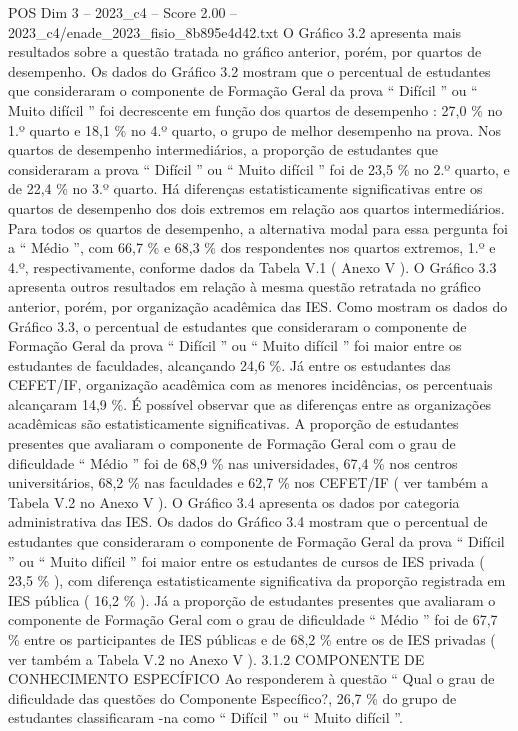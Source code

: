 \begin{textsample}{POS Dim 3 – 2023\_c4 – Score 2.00 – 2023\_c4/enade\_2023\_fisio\_8b895e4d42.txt}
O Gráfico 3.2 apresenta mais resultados sobre a questão tratada no gráfico anterior, porém, por quartos de desempenho.
Os dados do Gráfico 3.2 mostram que o percentual de estudantes que consideraram o componente de Formação Geral da prova “ Difícil ” ou “ Muito difícil ” foi decrescente em função dos quartos de desempenho : 27,0 \% no 1.º quarto e 18,1 \% no 4.º quarto, o grupo de melhor desempenho na prova.
Nos quartos de desempenho intermediários, a proporção de estudantes que consideraram a prova “ Difícil ” ou “ Muito difícil ” foi de 23,5 \% no 2.º quarto, e de 22,4 \% no 3.º quarto.
Há diferenças estatisticamente significativas entre os quartos de desempenho dos dois extremos em relação aos quartos intermediários.
Para todos os quartos de desempenho, a alternativa modal para essa pergunta foi a “ Médio ”, com 66,7 \% e 68,3 \% dos respondentes nos quartos extremos, 1.º e 4.º, respectivamente, conforme dados da Tabela V.1 ( Anexo V ).
O Gráfico 3.3 apresenta outros resultados em relação à mesma questão retratada no gráfico anterior, porém, por organização acadêmica das IES.
Como mostram os dados do Gráfico 3.3, o percentual de estudantes que consideraram o componente de Formação Geral da prova “ Difícil ” ou “ Muito difícil ” foi maior entre os estudantes de faculdades, alcançando 24,6 \%.
Já entre os estudantes das CEFET/IF, organização acadêmica com as menores incidências, os percentuais alcançaram 14,9 \%.
É possível observar que as diferenças entre as organizações acadêmicas são estatisticamente significativas.
A proporção de estudantes presentes que avaliaram o componente de Formação Geral com o grau de dificuldade “ Médio ” foi de 68,9 \% nas universidades, 67,4 \% nos centros universitários, 68,2 \% nas faculdades e 62,7 \% nos CEFET/IF ( ver também a Tabela V.2 no Anexo V ).
O Gráfico 3.4 apresenta os dados por categoria administrativa das IES.
Os dados do Gráfico 3.4 mostram que o percentual de estudantes que consideraram o componente de Formação Geral da prova “ Difícil ” ou “ Muito difícil ” foi maior entre os estudantes de cursos de IES privada ( 23,5 \% ), com diferença estatisticamente significativa da proporção registrada em IES pública ( 16,2 \% ).
Já a proporção de estudantes presentes que avaliaram o componente de Formação Geral com o grau de dificuldade “ Médio ” foi de 67,7 \% entre os participantes de IES públicas e de 68,2 \% entre os de IES privadas ( ver também a Tabela V.2 no Anexo V ). 3.1.2 COMPONENTE DE CONHECIMENTO ESPECÍFICO Ao responderem à questão “ Qual o grau de dificuldade das questões do Componente Específico?, 26,7 \% do grupo de estudantes classificaram -na como “ Difícil ” ou “ Muito difícil ”.

\end{textsample}
